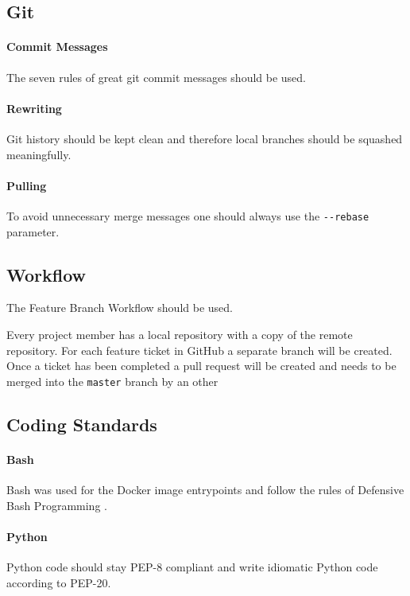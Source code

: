 \subsection{Git}\label{git}
\paragraph{Commit Messages}
The seven rules of great git commit
messages\cite{pm_8_chris.beams.io_2015} should be used.

\paragraph{Rewriting}
Git history should be kept clean and therefore local branches should be
squashed meaningfully.

\paragraph{Pulling}
To avoid unnecessary merge messages one should always use the
\texttt{-\/-rebase} parameter.

\subsection{Workflow}\label{git-workflow}
The Feature Branch Workflow\cite{pm_9_atlassian_git_tutorial_2015} should be used.

Every project member has a local repository with a copy of the remote
repository. For each feature ticket in GitHub a separate branch
will be created. Once a ticket has been completed a pull request will be
created and needs to be merged into the \texttt{master} branch by an other 

\subsection{Coding Standards}

\paragraph{Bash} Bash was used for the Docker image entrypoints and follow
the rules of Defensive Bash Programming \cite{pm_10_lavi_2012}.

\paragraph{Python} Python code should stay PEP-8\cite{pm_11_python.org_2015} compliant and write idiomatic Python code according to PEP-20\cite{pm_12_python.org_2015}.

